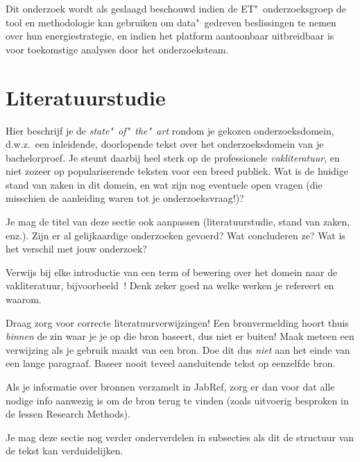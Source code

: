 Dit onderzoek wordt als geslaagd beschouwd indien de ET"~onderzoeksgroep de tool en methodologie kan gebruiken om data"~gedreven beslissingen te nemen over hun energiestrategie, en indien het platform aantoonbaar uitbreidbaar is voor toekomstige analyses door het onderzoeksteam.

\section{Literatuurstudie}%
\label{sec:literatuurstudie}

Hier beschrijf je de \emph{state"~of"~the"~art} rondom je gekozen onderzoeksdomein, d.w.z.\ een inleidende, doorlopende tekst over het onderzoeksdomein van je bachelorproef. Je steunt daarbij heel sterk op de professionele \emph{vakliteratuur}, en niet zozeer op populariserende teksten voor een breed publiek. Wat is de huidige stand van zaken in dit domein, en wat zijn nog eventuele open vragen (die misschien de aanleiding waren tot je onderzoeksvraag!)?

Je mag de titel van deze sectie ook aanpassen (literatuurstudie, stand van zaken, enz.). Zijn er al gelijkaardige onderzoeken gevoerd? Wat concluderen ze? Wat is het verschil met jouw onderzoek?

Verwijs bij elke introductie van een term of bewering over het domein naar de vakliteratuur, bijvoorbeeld~\autocite{Hykes2013}! Denk zeker goed na welke werken je refereert en waarom.

Draag zorg voor correcte literatuurverwijzingen! Een bronvermelding hoort thuis \emph{binnen} de zin waar je je op die bron baseert, dus niet er buiten! Maak meteen een verwijzing als je gebruik maakt van een bron. Doe dit dus \emph{niet} aan het einde van een lange paragraaf. Baseer nooit teveel aansluitende tekst op eenzelfde bron.

Als je informatie over bronnen verzamelt in JabRef, zorg er dan voor dat alle nodige info aanwezig is om de bron terug te vinden (zoals uitvoerig besproken in de lessen Research Methods).


Je mag deze sectie nog verder onderverdelen in subsecties als dit de structuur van de tekst kan verduidelijken.

